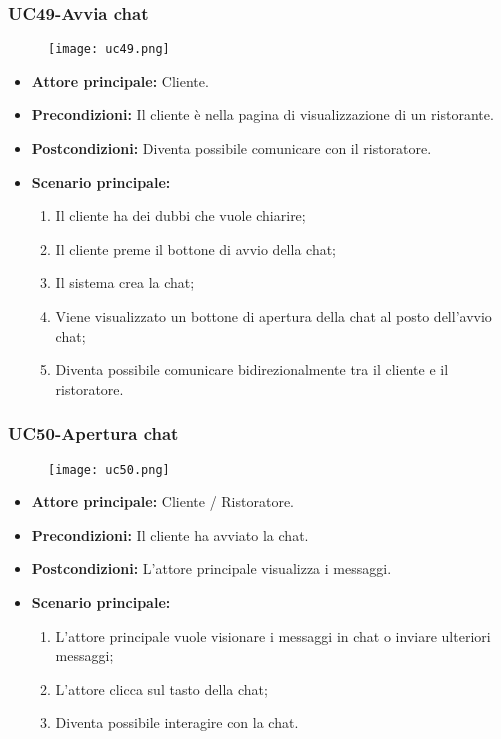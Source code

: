 \pagebreak
\subsubsection{UC49-Avvia chat}
\begin{figure}[h] \texttt{[image: uc49.png]} \end{figure}
\begin{itemize}
\item \textbf{Attore principale:} Cliente.
\item \textbf{Precondizioni:} Il cliente è nella pagina di visualizzazione di un ristorante.
\item \textbf{Postcondizioni:} Diventa possibile comunicare con il ristoratore.
\item \textbf{Scenario principale:}
\begin{enumerate}
    \item Il cliente ha dei dubbi che vuole chiarire;
    \item Il cliente preme il bottone di avvio della chat;
    \item Il sistema crea la chat;
    \item Viene visualizzato un bottone di apertura della chat al posto dell'avvio chat;
    \item Diventa possibile comunicare bidirezionalmente tra il cliente e il ristoratore.
\end{enumerate}
\end{itemize}

\subsubsection{UC50-Apertura chat}
\begin{figure}[h] \texttt{[image: uc50.png]} \end{figure}
\begin{itemize}
\item \textbf{Attore principale:} Cliente / Ristoratore.
\item \textbf{Precondizioni:} Il cliente ha avviato la chat.
\item \textbf{Postcondizioni:} L'attore principale visualizza i messaggi.
\item \textbf{Scenario principale:}
\begin{enumerate}
    \item L'attore principale vuole visionare i messaggi in chat o inviare ulteriori messaggi;
    \item L'attore clicca sul tasto della chat;
    \item Diventa possibile interagire con la chat.
\end{enumerate}
\end{itemize}

